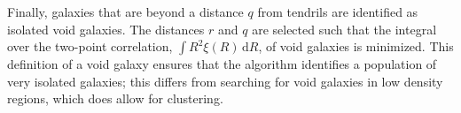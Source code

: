 Finally, galaxies that are beyond a distance $q$ from tendrils are identified as isolated void galaxies. The distances $r$ and $q$ are selected such that the integral over the two-point correlation, $\int R^2 \xi(R) \,\mathrm{d} R$, of void galaxies is minimized. This definition of a void galaxy ensures that the algorithm identifies a population of very isolated galaxies; this differs from searching for void galaxies in low density regions, which does allow for clustering. 


%





